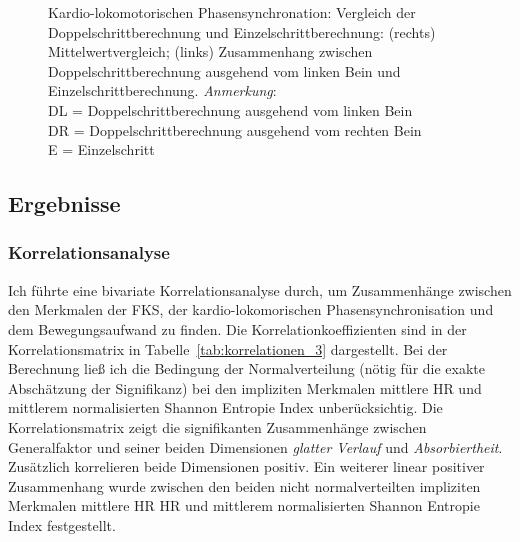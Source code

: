 \begin{figure}
	[!htb]  \caption[Kardio-lokomotorischen Phasensynchronation: Vergleich der Doppelschrittberechnung und Einzelschrittberechnung]{Kardio-lokomotorischen Phasensynchronation: Vergleich der Doppelschrittberechnung und Einzelschrittberechnung: (rechts) Mittelwertvergleich; (links) Zusammenhang zwischen Doppelschrittberechnung ausgehend vom linken Bein und Einzelschrittberechnung. \emph{Anmerkung}: \\ \hspace{\textwidth}DL = Doppelschrittberechnung ausgehend vom linken Bein \\ \hspace{\textwidth}DR = Doppelschrittberechnung ausgehend vom rechten Bein \\ \hspace{\textwidth}E = Einzelschritt} \label{fig:index_vergleich} 
\end{figure}

\subsection{Ergebnisse} %
\label{sub:ergebnisse_5_3}

\subsubsection{Korrelationsanalyse} %
\label{ssub:korrelationsanalyse_5_3}

Ich führte eine bivariate Korrelationsanalyse durch, um Zusammenhänge zwischen den Merkmalen der \ac{FKS}, der kardio-lokomorischen Phasensynchronisation und dem Bewegungsaufwand zu finden. Die Korrelationkoeffizienten sind in der Korrelationsmatrix in Tabelle~\ref{tab:korrelationen_3} dargestellt. Bei der Berechnung ließ ich die Bedingung der Normalverteilung (nötig für die exakte Abschätzung der Signifikanz) bei den impliziten Merkmalen mittlere \ac{HR} und mittlerem normalisierten Shannon Entropie Index unberücksichtig. Die Korrelationsmatrix zeigt die signifikanten Zusammenhänge zwischen Generalfaktor und seiner beiden Dimensionen \emph{glatter Verlauf} und \emph{Absorbiertheit}. Zusätzlich korrelieren beide Dimensionen positiv. Ein weiterer linear positiver Zusammenhang wurde zwischen den beiden nicht normalverteilten impliziten Merkmalen mittlere HR \ac{HR} und mittlerem normalisierten Shannon Entropie Index festgestellt.

